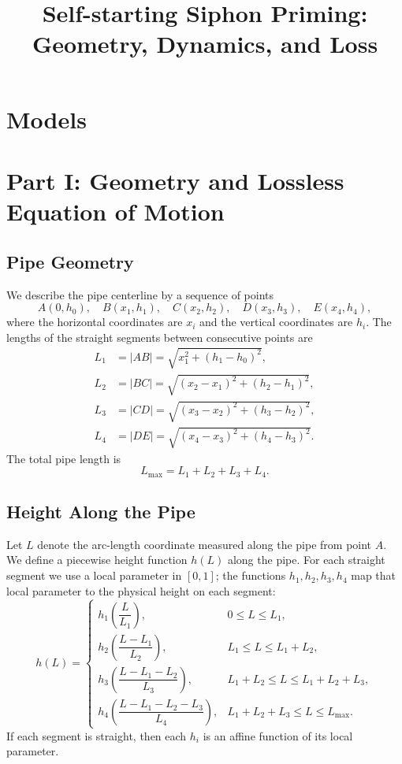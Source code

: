 \documentclass[11pt]{article}
\title{Self-starting Siphon Priming: Geometry, Dynamics, and Loss}
\author{}
\date{}
\begin{document}
\maketitle

\section*{Models}

\section{Part I: Geometry and Lossless Equation of Motion}

\subsection{Pipe Geometry}

We describe the pipe centerline by a sequence of points
\[
A(0, h_0),\quad B(x_1, h_1),\quad C(x_2, h_2),\quad D(x_3, h_3),\quad E(x_4, h_4),
\]
where the horizontal coordinates are $x_i$ and the vertical coordinates are $h_i$.
The lengths of the straight segments between consecutive points are
\begin{align*}
L_1 &= \lvert AB \rvert = \sqrt{x_1^2 + (h_1 - h_0)^2}, \\
L_2 &= \lvert BC \rvert = \sqrt{(x_2 - x_1)^2 + (h_2 - h_1)^2}, \\
L_3 &= \lvert CD \rvert = \sqrt{(x_3 - x_2)^2 + (h_3 - h_2)^2}, \\
L_4 &= \lvert DE \rvert = \sqrt{(x_4 - x_3)^2 + (h_4 - h_3)^2}.
\end{align*}
The total pipe length is
\[
L_{\max} = L_1 + L_2 + L_3 + L_4.
\]

\subsection{Height Along the Pipe}

Let $L$ denote the arc-length coordinate measured along the pipe from point $A$.
We define a piecewise height function $h(L)$ along the pipe. For each straight
segment we use a local parameter in $[0, 1]$; the functions $h_1, h_2, h_3, h_4$
map that local parameter to the physical height on each segment:
\[
h(L) =
\begin{cases}
 h_1\!\left(\dfrac{L}{L_1}\right), & 0 \le L \le L_1, \\[1.0em]
 h_2\!\left(\dfrac{L - L_1}{L_2}\right), & L_1 \le L \le L_1 + L_2, \\[1.0em]
 h_3\!\left(\dfrac{L - L_1 - L_2}{L_3}\right), & L_1 + L_2 \le L \le L_1 + L_2 + L_3, \\[1.0em]
 h_4\!\left(\dfrac{L - L_1 - L_2 - L_3}{L_4}\right), & L_1 + L_2 + L_3 \le L \le L_{\max}.
\end{cases}
\]
If each segment is straight, then each $h_i$ is an affine function of its local
parameter.
\end{document}
